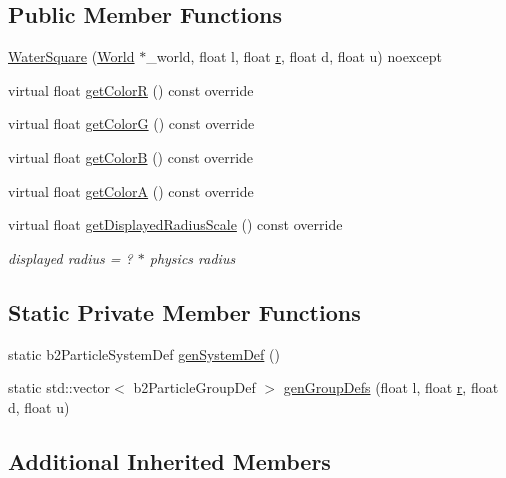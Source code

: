 \subsection*{Public Member Functions}
\begin{DoxyCompactItemize}
\item 
\hyperlink{classWaterSquare_ab34c28194e6b09837e2bcd7cafef314e}{Water\+Square} (\hyperlink{classWorld}{World} $\ast$\+\_\+world, float l, float \hyperlink{image_8h_a62969232668331297e2dca1ae2ddd10d}{r}, float d, float u) noexcept
\item 
virtual float \hyperlink{classWaterSquare_ae34b29db832bbe03ce6521493a17fac3}{get\+Color\+R} () const override
\item 
virtual float \hyperlink{classWaterSquare_ae63df10dd32846cca279aef4f86da099}{get\+Color\+G} () const override
\item 
virtual float \hyperlink{classWaterSquare_a6dd404113fa8377a06d4dd62fd711578}{get\+Color\+B} () const override
\item 
virtual float \hyperlink{classWaterSquare_a7f549f3b3c9b7a350aa2ae62c4db7ce5}{get\+Color\+A} () const override
\item 
virtual float \hyperlink{classWaterSquare_aefb21ab0a4f52f3fbd998d2c7e4feed4}{get\+Displayed\+Radius\+Scale} () const override
\begin{DoxyCompactList}\small\item\em displayed radius = ? $\ast$ physics radius \end{DoxyCompactList}\end{DoxyCompactItemize}
\subsection*{Static Private Member Functions}
\begin{DoxyCompactItemize}
\item 
static b2\+Particle\+System\+Def \hyperlink{classWaterSquare_a113c93a298b7c3bc6354f8a96da26ebf}{gen\+System\+Def} ()
\item 
static std\+::vector$<$ b2\+Particle\+Group\+Def $>$ \hyperlink{classWaterSquare_aa67540868286528f0fb1c8c07d1db2ce}{gen\+Group\+Defs} (float l, float \hyperlink{image_8h_a62969232668331297e2dca1ae2ddd10d}{r}, float d, float u)
\end{DoxyCompactItemize}
\subsection*{Additional Inherited Members}


